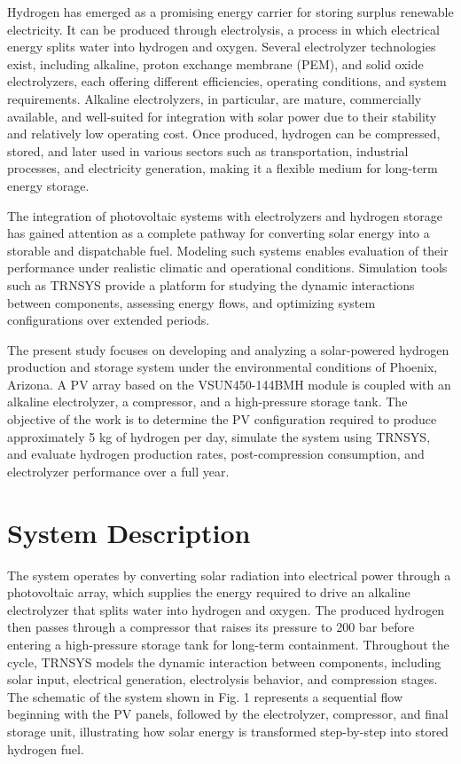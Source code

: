 \documentclass[11pt,a4paper]{article}
\begin{document}
Hydrogen has emerged as a promising energy carrier for storing surplus renewable electricity. It can be produced through electrolysis, a process in which electrical energy splits water into hydrogen and oxygen. Several electrolyzer technologies exist, including alkaline, proton exchange membrane (PEM), and solid oxide electrolyzers, each offering different efficiencies, operating conditions, and system requirements. Alkaline electrolyzers, in particular, are mature, commercially available, and well-suited for integration with solar power due to their stability and relatively low operating cost. Once produced, hydrogen can be compressed, stored, and later used in various sectors such as transportation, industrial processes, and electricity generation, making it a flexible medium for long-term energy storage.

The integration of photovoltaic systems with electrolyzers and hydrogen storage has gained attention as a complete pathway for converting solar energy into a storable and dispatchable fuel. Modeling such systems enables evaluation of their performance under realistic climatic and operational conditions. Simulation tools such as TRNSYS provide a platform for studying the dynamic interactions between components, assessing energy flows, and optimizing system configurations over extended periods.

The present study focuses on developing and analyzing a solar-powered hydrogen production and storage system under the environmental conditions of Phoenix, Arizona. A PV array based on the VSUN450-144BMH module is coupled with an alkaline electrolyzer, a compressor, and a high-pressure storage tank. The objective of the work is to determine the PV configuration required to produce approximately 5 kg of hydrogen per day, simulate the system using TRNSYS, and evaluate hydrogen production rates, post-compression consumption, and electrolyzer performance over a full year.

\FloatBarrier
\section{System Description}

The system operates by converting solar radiation into electrical power through a photovoltaic array, which supplies the energy required to drive an alkaline electrolyzer that splits water into hydrogen and oxygen. The produced hydrogen then passes through a compressor that raises its pressure to 200 bar before entering a high-pressure storage tank for long-term containment. Throughout the cycle, TRNSYS models the dynamic interaction between components, including solar input, electrical generation, electrolysis behavior, and compression stages. The schematic of the system shown in Fig. 1 represents a sequential flow beginning with the PV panels, followed by the electrolyzer, compressor, and final storage unit, illustrating how solar energy is transformed step-by-step into stored hydrogen fuel.
\end{document}
